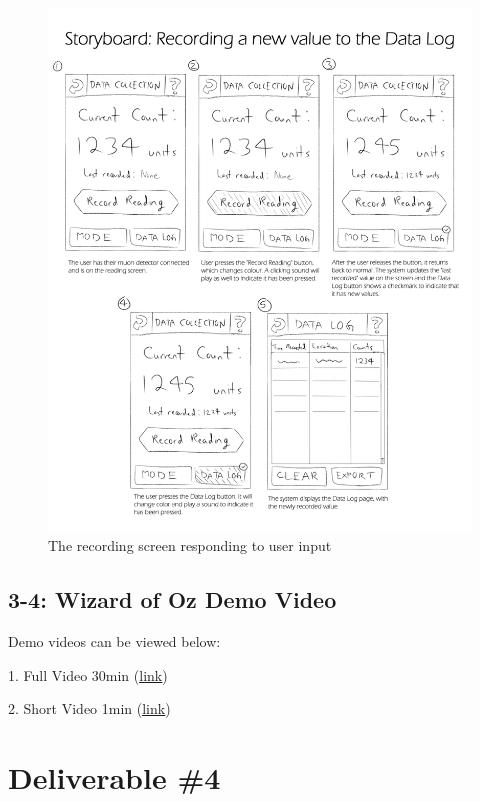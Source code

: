 \documentclass[11pt,a4paper]{article}
\begin{document}
\bigskip
\begin{figure}[h]
  \centering
  \hspace*{-0.5cm}
      \includegraphics[width=1.15\textwidth]{storyboard.png}
  \caption{The recording screen responding to user input}
\end{figure}

\newpage
\subsection*{3-4: Wizard of Oz Demo Video}

Demo videos can be viewed below:

1. Full Video 30min (\href{https://drive.google.com/file/d/1D5OwAUCmAK5fYUDqaYs4WdFURqq9lxwS/view}{\underline{link}})

2. Short Video 1min (\href{https://drive.google.com/file/d/1GZPQ2MqETNLw6sNSMTrlxhX4ftYG58Hb/view?usp=sharing}{\underline{link}})






\section*{Deliverable \#4}
\end{document}
